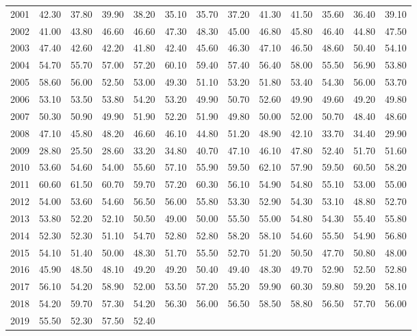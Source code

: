 \begin{longtable}{rrrrrrrrrrrrr}
  2001 & 42.30 & 37.80 & 39.90 & 38.20 & 35.10 & 35.70 & 37.20 & 41.30 & 41.50 & 35.60 & 36.40 & 39.10 \\ 
  2002 & 41.00 & 43.80 & 46.60 & 46.60 & 47.30 & 48.30 & 45.00 & 46.80 & 45.80 & 46.40 & 44.80 & 47.50 \\ 
  2003 & 47.40 & 42.60 & 42.20 & 41.80 & 42.40 & 45.60 & 46.30 & 47.10 & 46.50 & 48.60 & 50.40 & 54.10 \\ 
  2004 & 54.70 & 55.70 & 57.00 & 57.20 & 60.10 & 59.40 & 57.40 & 56.40 & 58.00 & 55.50 & 56.90 & 53.80 \\ 
  2005 & 58.60 & 56.00 & 52.50 & 53.00 & 49.30 & 51.10 & 53.20 & 51.80 & 53.40 & 54.30 & 56.00 & 53.70 \\ 
  2006 & 53.10 & 53.50 & 53.80 & 54.20 & 53.20 & 49.90 & 50.70 & 52.60 & 49.90 & 49.60 & 49.20 & 49.80 \\ 
  2007 & 50.30 & 50.90 & 49.90 & 51.90 & 52.20 & 51.90 & 49.80 & 50.00 & 52.00 & 50.70 & 48.40 & 48.60 \\ 
  2008 & 47.10 & 45.80 & 48.20 & 46.60 & 46.10 & 44.80 & 51.20 & 48.90 & 42.10 & 33.70 & 34.40 & 29.90 \\ 
  2009 & 28.80 & 25.50 & 28.60 & 33.20 & 34.80 & 40.70 & 47.10 & 46.10 & 47.80 & 52.40 & 51.70 & 51.60 \\ 
  2010 & 53.60 & 54.60 & 54.00 & 55.60 & 57.10 & 55.90 & 59.50 & 62.10 & 57.90 & 59.50 & 60.50 & 58.20 \\ 
  2011 & 60.60 & 61.50 & 60.70 & 59.70 & 57.20 & 60.30 & 56.10 & 54.90 & 54.80 & 55.10 & 53.00 & 55.00 \\ 
  2012 & 54.00 & 53.60 & 54.60 & 56.50 & 56.00 & 55.80 & 53.30 & 52.90 & 54.30 & 53.10 & 48.80 & 52.70 \\ 
  2013 & 53.80 & 52.20 & 52.10 & 50.50 & 49.00 & 50.00 & 55.50 & 55.00 & 54.80 & 54.30 & 55.40 & 55.80 \\ 
  2014 & 52.30 & 52.30 & 51.10 & 54.70 & 52.80 & 52.80 & 58.20 & 58.10 & 54.60 & 55.50 & 54.90 & 56.80 \\ 
  2015 & 54.10 & 51.40 & 50.00 & 48.30 & 51.70 & 55.50 & 52.70 & 51.20 & 50.50 & 47.70 & 50.80 & 48.00 \\ 
  2016 & 45.90 & 48.50 & 48.10 & 49.20 & 49.20 & 50.40 & 49.40 & 48.30 & 49.70 & 52.90 & 52.50 & 52.80 \\ 
  2017 & 56.10 & 54.20 & 58.90 & 52.00 & 53.50 & 57.20 & 55.20 & 59.90 & 60.30 & 59.80 & 59.20 & 58.10 \\ 
  2018 & 54.20 & 59.70 & 57.30 & 54.20 & 56.30 & 56.00 & 56.50 & 58.50 & 58.80 & 56.50 & 57.70 & 56.00 \\ 
  2019 & 55.50 & 52.30 & 57.50 & 52.40 &  &  &  &  &  &  &  &  \\ 
   \hline
\hline
\end{longtable}
